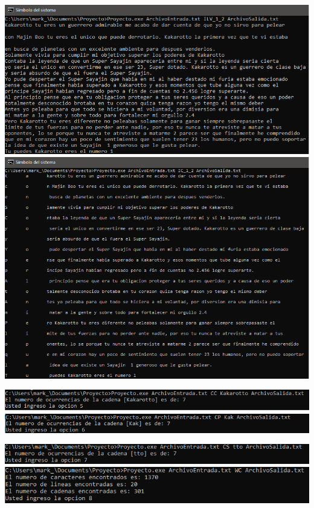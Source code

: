 \documentclass[12pt,letterpaper]{report}
\begin{document}
\begin{multicols}{2}
\includegraphics[scale=0.35]{Salida3}
\includegraphics[scale=0.35]{Salida4}
\end{multicols}


\begin{multicols}{2}
\includegraphics[scale=0.35]{Salida5}\\
\includegraphics[scale=0.35]{Salida6}
\end{multicols}


\begin{multicols}{2}
\includegraphics[scale=0.25]{Salida7}\\
\includegraphics[scale=0.25]{Salida8}
\end{multicols}
\end{document}
